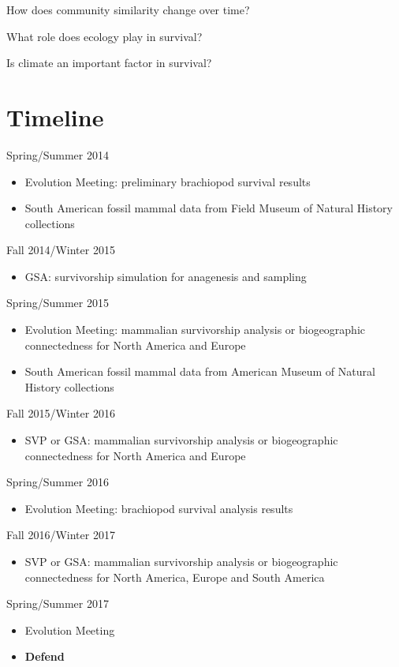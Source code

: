 \documentclass[12pt,letterpaper]{article}
\begin{document}
How does community similarity change over time?

What role does ecology play in survival?

Is climate an important factor in survival?


\clearpage
\section{Timeline}

Spring/Summer 2014
\begin{itemize}
  \item Evolution Meeting: preliminary brachiopod survival results
  \item South American fossil mammal data from Field Museum of Natural History collections
\end{itemize}

Fall 2014/Winter 2015
\begin{itemize}
  \item GSA: survivorship simulation for anagenesis and sampling
\end{itemize}

Spring/Summer 2015
\begin{itemize}
  \item Evolution Meeting: mammalian survivorship analysis or biogeographic connectedness for North America and Europe
  \item South American fossil mammal data from American Museum of Natural History collections
\end{itemize}

Fall 2015/Winter 2016
\begin{itemize}
  \item SVP or GSA: mammalian survivorship analysis or biogeographic connectedness for North America and Europe
\end{itemize}

Spring/Summer 2016
\begin{itemize}
  \item Evolution Meeting: brachiopod survival analysis results
\end{itemize}

Fall 2016/Winter 2017
\begin{itemize}
  \item SVP or GSA: mammalian survivorship analysis or biogeographic connectedness for North America, Europe and South America
\end{itemize}

Spring/Summer 2017
\begin{itemize}
  \item Evolution Meeting
  \item \textbf{Defend}
\end{itemize}



\clearpage


\end{document}
